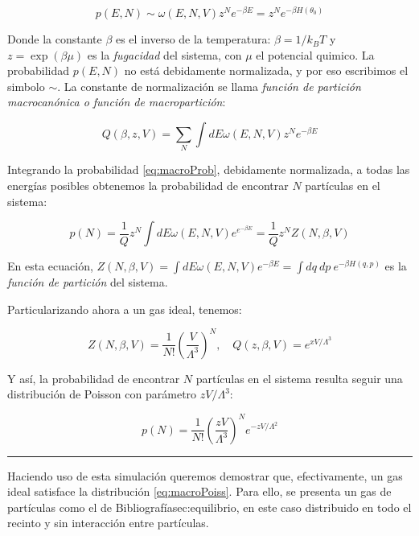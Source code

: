 \documentclass[11pt, a4paper]{article} %
\renewcommand\ref{Bibliografía}
\theoremstyle{named}
\begin{document}
\begin{equation}\label{eq:macroProb}
p(E, N) \sim \omega(E, N, V) z^{N} e^{-\beta E}=z^{N} e^{-\beta H\left(\theta_{0}\right)}
\end{equation}

Donde la constante $\beta$ es el inverso de la temperatura: $\beta=1 / k_{B} T$ y $z=\exp (\beta \mu)$ es la \textit{fugacidad} del sistema, con $\mu$ el potencial quimico. La probabilidad $p(E, N)$ no está debidamente normalizada, y por eso escribimos el simbolo $\sim$. La constante de normalización se llama \textit{función de partición macrocanónica o función de macropartición}:

\begin{equation}
    Q(\beta, z, V)=\sum_{N} \int d E \omega(E, N, V) z^{N} e^{-\beta E}
\end{equation}

Integrando la probabilidad \eqref{eq:macroProb}, debidamente normalizada, a todas las energías posibles obtenemos la probabilidad de encontrar $N$ partículas en el sistema:

\begin{equation}
    p(N)=\frac{1}{Q} z^{N} \int d E \omega(E, N, V) e^{e^{-\beta E}}=\frac{1}{Q} z^{N} Z(N, \beta, V)
\end{equation}

En esta ecuación, $Z(N, \beta, V)=\int d E \omega(E, N, V) e^{-\beta E}=\int d q \ d p \ e^{-\beta H(q,p)}$ es la \textit{función de partición} del sistema.

Particularizando ahora a un gas ideal, tenemos:

\begin{equation}
Z(N, \beta, V)=\frac{1}{N !}\left(\frac{V}{\Lambda^{3}}\right)^{N}, \quad Q(z, \beta, V)=e^{x V / \Lambda^{3}}
\end{equation}

Y así, la probabilidad de encontrar $N$ partículas en el sistema resulta seguir una distribución de Poisson con parámetro $zV / \Lambda^3$:

\begin{equation}\label{eq:macroPoiss}
    p(N)=\frac{1}{N !}\left(\frac{z V}{\Lambda^{3}}\right)^{N} e^{-z V / \Lambda^{2}}
\end{equation}

\noindent\rule{\linewidth}{0.4pt}

Haciendo uso de esta simulación queremos demostrar que, efectivamente, un gas ideal satisface la distribución \eqref{eq:macroPoiss}. Para ello, se presenta un gas de partículas como el de \ref{sec:equilibrio}, en este caso distribuido en todo el recinto y sin interacción entre partículas.
\end{document}
